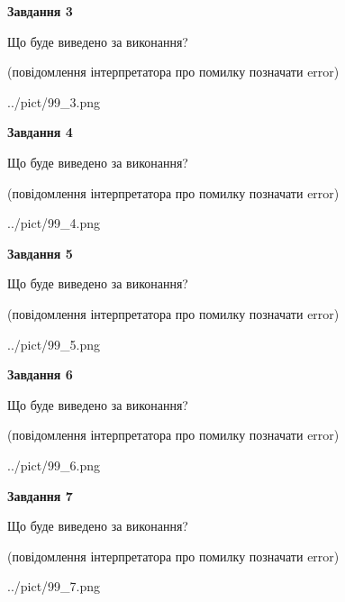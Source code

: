 \documentclass[12pt, ukrainian]{article}
\begin{document}
{\begin {large}
{\begin {center}\textbf{Завдання 3}\end {center}}\par
Що буде виведено за виконання?\par
 (повідомлення інтерпретатора про помилку позначати error)\par
\begin{center}
	{../pict/99_3.png}
\end{center}
\newpage

{\begin {center}\textbf{Завдання 4}\end {center}}\par
Що буде виведено за виконання?\par
 (повідомлення інтерпретатора про помилку позначати error)\par
\begin{center}
	{../pict/99_4.png}
\end{center}
\newpage

{\begin {center}\textbf{Завдання 5}\end {center}}\par
Що буде виведено за виконання?\par
 (повідомлення інтерпретатора про помилку позначати error)\par
\begin{center}
	{../pict/99_5.png}
\end{center}
\newpage

{\begin {center}\textbf{Завдання 6}\end {center}}\par
Що буде виведено за виконання?\par
 (повідомлення інтерпретатора про помилку позначати error)\par
\begin{center}
	{../pict/99_6.png}
\end{center}
\newpage

{\begin {center}\textbf{Завдання 7}\end {center}}\par
Що буде виведено за виконання?\par
 (повідомлення інтерпретатора про помилку позначати error)\par
\begin{center}
	{../pict/99_7.png}
\end{center}
\newpage


\end{large}}
\end{document}
